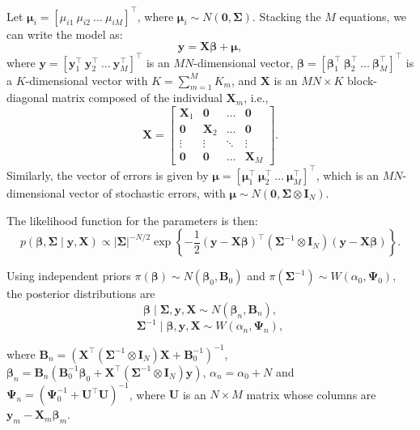 Let $\bm{\mu}_i = \left[\mu_{i1} \ \mu_{i2} \ \dots \ \mu_{iM}\right]^{\top}$, where $\bm{\mu}_i \sim {N}(\bm{0}, \bm{\Sigma})$. Stacking the $M$ equations, we can write the model as:
\[
\bm{y} = \bm{X} \bm{\beta} + \bm{\mu},
\]
where $\bm{y} = \left[\bm{y}_1^{\top} \ \bm{y}_2^{\top} \ \dots \ \bm{y}_M^{\top}\right]^{\top}$ is an $MN$-dimensional vector, $\bm{\beta} = \left[\bm{\beta}_1^{\top} \ \bm{\beta}_2^{\top} \ \dots \ \bm{\beta}_M^{\top}\right]^{\top}$ is a $K$-dimensional vector with $K = \sum_{m=1}^M K_m$, and $\bm{X}$ is an $MN \times K$ block-diagonal matrix composed of the individual $\bm{X}_m$, i.e.,
\[
\bm{X} = \begin{bmatrix}
	\bm{X}_1 & \bm{0} & \dots & \bm{0} \\
	\bm{0} & \bm{X}_2 & \dots & \bm{0} \\
	\vdots & \vdots & \ddots & \vdots \\
	\bm{0} & \bm{0} & \dots & \bm{X}_M
\end{bmatrix}.
\]
Similarly, the vector of errors is given by $\bm{\mu} = \left[\bm{\mu}_1^{\top} \ \bm{\mu}_2^{\top} \ \dots \ \bm{\mu}_M^{\top}\right]^{\top}$, which is an $MN$-dimensional vector of stochastic errors, with $\bm{\mu} \sim {N}(\bm{0}, \bm{\Sigma} \otimes \bm{I}_N)$.

The likelihood function for the parameters is then:
\[
p(\bm{\beta}, \bm{\Sigma} \mid \bm{y}, \bm{X}) \propto |\bm{\Sigma}|^{-N/2} \exp\left\{ -\frac{1}{2} (\bm{y} - \bm{X} \bm{\beta})^{\top} (\bm{\Sigma}^{-1} \otimes \bm{I}_N) (\bm{y} - \bm{X} \bm{\beta}) \right\}.
\]

Using independent priors $\pi(\bm{\beta})\sim{N}(\bm{\beta}_0,\bm{B}_0)$ and $\pi(\bm{\Sigma}^{-1})\sim{W}(\alpha_0,\bm{\Psi}_0)$, the posterior distributions are
\begin{equation*}
	\bm{\beta}\mid\bm{\Sigma}, \bm{y}, \bm{X} \sim {N}(\bm{\beta}_n, \bm{B}_n), 
\end{equation*}
\begin{equation*}
	\bm{\Sigma}^{-1}\mid\bm{\beta}, \bm{y}, \bm{X} \sim {W}(\alpha_n, \bm{\Psi}_n),
\end{equation*}

where $\bm{B}_n=(\bm{X}^{\top}(\bm{\Sigma}^{-1}\otimes \bm{I}_N )\bm{X}+\bm{B}_0^{-1})^{-1}$, $\bm{\beta}_n=\bm{B}_n(\bm{B}_0^{-1}\bm{\beta}_0 + \bm{X}^{\top}(\bm{\Sigma}^{-1}\otimes \bm{I}_N)\bm{y})$, $\alpha_n = \alpha_0 + N$ and $\bm{\Psi}_n = (\bm{\Psi}_0^{-1} + \bm{U}^{\top}\bm{U})^{-1}$, where $\bm{U}$ is an $N\times M$ matrix whose columns are $\bm{y}_m-\bm{X}_m\bm{\beta}_m$. 


